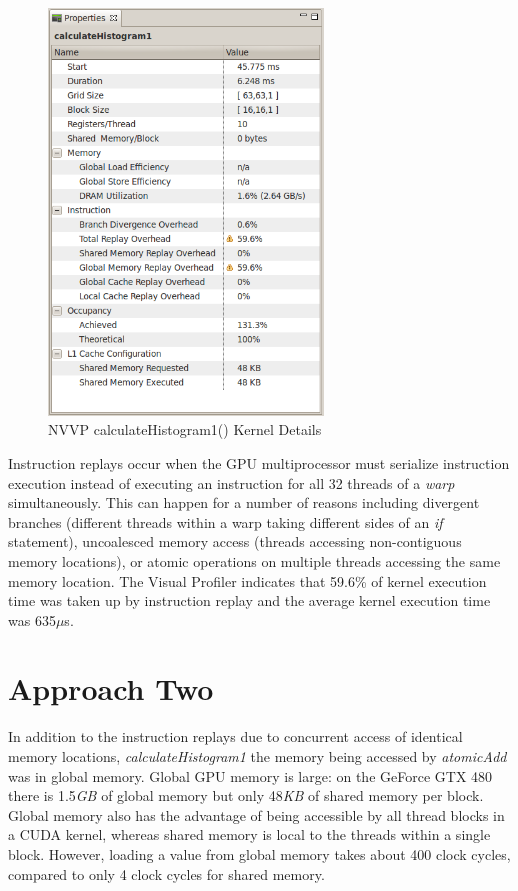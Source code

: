 \documentclass{article}
\begin{document}
\begin{figure}
\centering
\includegraphics[width=0.65\textwidth]{screenshots/nvvp/calculateHistogram1_screen3.png}
\caption{NVVP calculateHistogram1() Kernel Details}
\label{kernel1nvvp3}
\end{figure}


Instruction replays occur when the GPU multiprocessor must serialize instruction execution instead of executing an instruction for all 32 threads of a \emph{warp} simultaneously. This can happen for a number of reasons including divergent branches (different threads within a warp taking different sides of an \emph{if} statement), uncoalesced memory access (threads accessing non-contiguous memory locations), or atomic operations on multiple threads accessing the same memory location. The Visual Profiler indicates that 59.6\% of kernel execution time was taken up by instruction replay and the average kernel execution time was 635$\mu$s.

\section{Approach Two}\label{approach2}

In addition to the instruction replays due to concurrent access of identical memory locations, \emph{calculateHistogram1} the memory being accessed by \emph{atomicAdd} was in global memory. Global GPU memory is large: on the GeForce GTX 480 there is 1.5\emph{GB} of global memory but only 48\emph{KB} of shared memory per block\cite{geforce480}. Global memory also has the advantage of being accessible by all thread blocks in a CUDA kernel, whereas shared memory is local to the threads within a single block. However, loading a value from global memory takes about 400 clock cycles, compared to only 4 clock cycles for shared memory\cite{shared-memory}.
\end{document}
